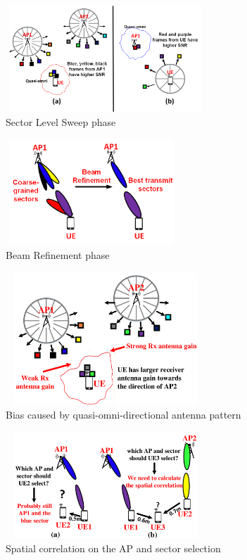 \documentclass[conference]{IEEEtran}
\begin{document}
\begin{figure}
	\centerline{\includegraphics[width=7.5cm,height=4cm]{sls}}
	\caption[U-example]{Sector Level Sweep phase}
\end{figure}
\begin{figure}
	\centerline{\includegraphics[width=6.5cm,height=4cm]{brp}}
	\caption[U-example]{Beam Refinement phase}
\end{figure}
\begin{figure}
	\centerline{\includegraphics[width=7.5cm,height=5cm]{motivation1}}
	\caption[U-example]{Bias caused by quasi-omni-directional antenna pattern}
\end{figure}
\begin{figure}[t!]
	\centerline{\includegraphics[width=7.5cm,height=4cm]{motivation2}}
	\caption[U-example]{Spatial correlation on the AP and sector selection}
\end{figure}
\end{document}
